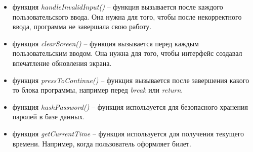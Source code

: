 \begin{itemize}
    \item функция \textit{handleInvalidInput()} -- функция вызывается после каждого пользовательского ввода. Она нужна для того, чтобы после некорректного ввода, программа не завершала свою работу.
    \item функция \textit{clearScreen()} -- функция вызывается перед каждым пользовательским вводом. Она нужна для того, чтобы интерфейс создавал впечатление обновления экрана.
    \item функция \textit{pressToContinue()} -- функция вызывается после завершения какого то блока программы, например перед \textit{break} или \textit{return}.
    \item функция \textit{hashPassword()} -- функция используется для безопасного хранения паролей в базе данных.
    \item функция \textit{getCurrentTime} -- функция используется для получения текущего времени. Например, когда пользователь оформляет билет.
\end{itemize}
